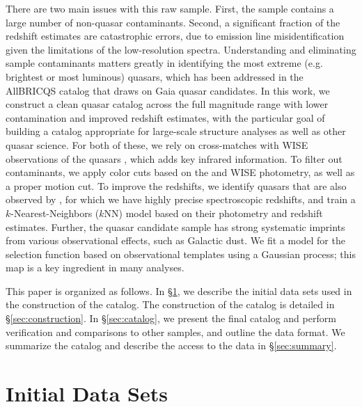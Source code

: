 There are two main issues with this raw \Gaia sample.
First, the sample contains a large number of non-quasar contaminants.
Second, a significant fraction of the redshift estimates are catastrophic errors, due to emission line misidentification given the limitations of the low-resolution spectra.
Understanding and eliminating sample contaminants matters greatly in identifying the most extreme (e.g. brightest or most luminous) quasars, which has been addressed in the AllBRICQS catalog \citep{onken_allbricqs_2023} that draws on Gaia quasar candidates. 
In this work, we construct a clean quasar catalog across the full magnitude range with lower contamination and improved redshift estimates, with the particular goal of building a catalog appropriate for large-scale structure analyses as well as other quasar science.
For both of these, we rely on cross-matches with WISE observations of the quasars \citep{wright_wide-field_2010}, which adds key infrared information.
To filter out contaminants, we apply color cuts based on the \Gaia and WISE photometry, as well as a proper motion cut.
To improve the redshifts, we identify quasars that are also observed by \SDSS, for which we have highly precise spectroscopic redshifts, and train a $k$-Nearest-Neighbors ($k$NN) model based on their photometry and \Gaia redshift estimates.
Further, the \Gaia quasar candidate sample has strong systematic imprints from various observational effects, such as Galactic dust.
We fit a model for the selection function based on observational templates using a Gaussian process; this map is a key ingredient in many analyses.

This paper is organized as follows.
In \S\ref{sec:data}, we describe the initial data sets used in the construction of the catalog.
The construction of the catalog is detailed in \S\ref{sec:construction}.
In \S\ref{sec:catalog}, we present the final catalog and perform verification and comparisons to other samples, and outline the data format.
We summarize the catalog and describe the access to the data in \S\ref{sec:summary}.

\section{Initial Data Sets}
\label{sec:data}

